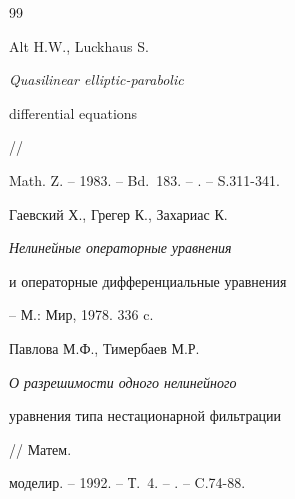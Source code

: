 \begin{thebibliography}{99}









Alt H.W., Luckhaus S. {\em Quasilinear elliptic-parabolic


differential equations} //


Math. Z. -- 1983. -- Bd.~183. -- . -- S.311-341.







Гаевский Х., Грегер К., Захариас К. {\em Нелинейные операторные уравнения


и операторные дифференциальные уравнения} -- М.: Мир, 1978. 336 c.







Павлова М.Ф., Тимербаев М.Р. {\em О разрешимости одного нелинейного


уравнения типа нестационарной фильтрации} // Матем.


моделир. -- 1992. -- Т.~4. -- . -- C.74-88.





\end{thebibliography}





\vskip 1cm















